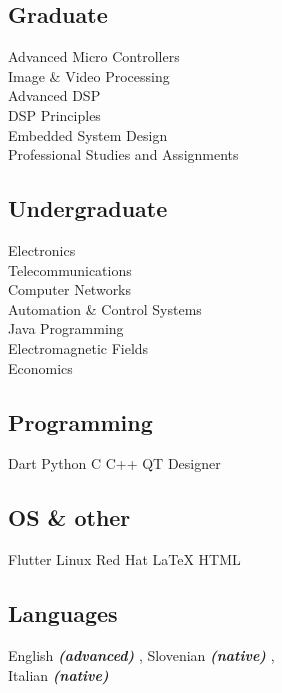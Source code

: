 \documentclass[draft]{dske-resume-openfont}
\begin{document}
\begin{minipage}[t]{0.33\textwidth}

\subsection{Graduate}
Advanced Micro Controllers \\
Image \& Video Processing\\
Advanced DSP \\
DSP Principles\\
Embedded System Design\\
Professional Studies and Assignments \sectionsep
\subsection{Undergraduate}
Electronics \\
Telecommunications \\
Computer Networks \\
Automation \& Control Systems \\
Java Programming \\
Electromagnetic Fields \\
Economics \\



\subsection{Programming}
Dart \textbullet{} Python \textbullet{} C \textbullet{} C++ 
\textbullet{} QT Designer\\

\sectionsep

\subsection{OS \& other}
Flutter \textbullet{} Linux Red Hat
\LaTeX \textbullet{} HTML\\ 

\sectionsep

\subsection{Languages}
English {\footnotesize \textit{\textbf{(advanced) }}}, Slovenian {\footnotesize \textit{\textbf{(native) }}}, \\ Italian {\footnotesize \textit{\textbf{(native) }}}


\end{minipage}
\end{document}
